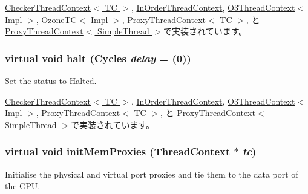 \hyperlink{classCheckerThreadContext_ac7399661f9073ba4ec121b87c782924b}{CheckerThreadContext$<$ TC $>$}, \hyperlink{classInOrderThreadContext_a03a07ebd804051b18b69156c2fff36a3}{InOrderThreadContext}, \hyperlink{classO3ThreadContext_a03a07ebd804051b18b69156c2fff36a3}{O3ThreadContext$<$ Impl $>$}, \hyperlink{classOzoneCPU_1_1OzoneTC_ac7399661f9073ba4ec121b87c782924b}{OzoneTC$<$ Impl $>$}, \hyperlink{classProxyThreadContext_ac7399661f9073ba4ec121b87c782924b}{ProxyThreadContext$<$ TC $>$}, と \hyperlink{classProxyThreadContext_ac7399661f9073ba4ec121b87c782924b}{ProxyThreadContext$<$ SimpleThread $>$}で実装されています。\hypertarget{classThreadContext_a1cf6e868fcd49300a04acd0cae4fd142}{
\subsubsection[{halt}]{\setlength{\rightskip}{0pt plus 5cm}virtual void halt ({\bf Cycles} {\em delay} = {(0)})}}
\label{classThreadContext_a1cf6e868fcd49300a04acd0cae4fd142}


\hyperlink{classSet}{Set} the status to Halted. 

\hyperlink{classCheckerThreadContext_aacddd436c183735798f7c5abbb7d6824}{CheckerThreadContext$<$ TC $>$}, \hyperlink{classInOrderThreadContext_ade40686c5cdae8911d4062b9bf3d5340}{InOrderThreadContext}, \hyperlink{classO3ThreadContext_ade40686c5cdae8911d4062b9bf3d5340}{O3ThreadContext$<$ Impl $>$}, \hyperlink{classProxyThreadContext_ade40686c5cdae8911d4062b9bf3d5340}{ProxyThreadContext$<$ TC $>$}, と \hyperlink{classProxyThreadContext_ade40686c5cdae8911d4062b9bf3d5340}{ProxyThreadContext$<$ SimpleThread $>$}で実装されています。\hypertarget{classThreadContext_a6657d03bdea324a6ada2e4450307262c}{
\subsubsection[{initMemProxies}]{\setlength{\rightskip}{0pt plus 5cm}virtual void initMemProxies ({\bf ThreadContext} $\ast$ {\em tc})}}
\label{classThreadContext_a6657d03bdea324a6ada2e4450307262c}
Initialise the physical and virtual port proxies and tie them to the data port of the CPU.

